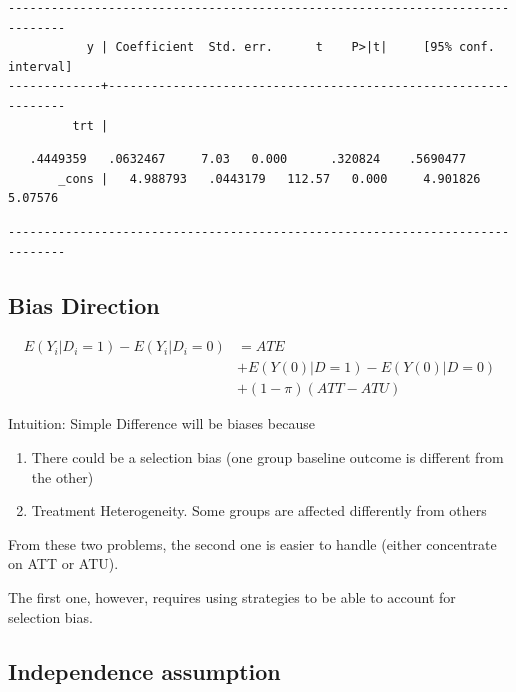 \documentclass[
  letterpaper,
  DIV=11,
  numbers=noendperiod]{scrartcl}
\begin{document}
\begin{verbatim}
------------------------------------------------------------------------------
           y | Coefficient  Std. err.      t    P>|t|     [95% conf. interval]
-------------+----------------------------------------------------------------
         trt |
\end{verbatim}

\begin{verbatim}
   .4449359   .0632467     7.03   0.000      .320824    .5690477
       _cons |   4.988793   .0443179   112.57   0.000     4.901826     5.07576
\end{verbatim}

\begin{verbatim}
------------------------------------------------------------------------------
\end{verbatim}

\hypertarget{bias-direction}{%
\subsection{Bias Direction}\label{bias-direction}}

\[
\begin{aligned}
E(Y_i|D_i=1)-E(Y_i|D_i=0) &= ATE  \\
&  +E(Y(0)|D=1)-E(Y(0)|D=0) \\
& +(1-\pi)(ATT-ATU)
\end{aligned}
\]

Intuition: Simple Difference will be biases because

\begin{enumerate}
\def\labelenumi{\arabic{enumi}.}
\item
  There could be a selection bias (one group baseline outcome is
  different from the other)
\item
  Treatment Heterogeneity. Some groups are affected differently from
  others
\end{enumerate}

From these two problems, the second one is easier to handle (either
concentrate on ATT or ATU).

The first one, however, requires using strategies to be able to account
for selection bias.

\hypertarget{independence-assumption}{%
\subsection{Independence assumption}\label{independence-assumption}}
\end{document}
